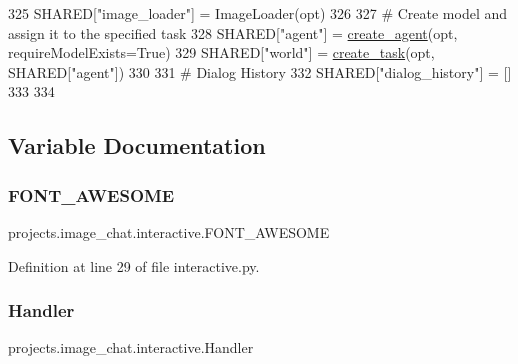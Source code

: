 \begin{DoxyCode}
325     SHARED[\textcolor{stringliteral}{"image\_loader"}] = ImageLoader(opt)
326 
327     \textcolor{comment}{# Create model and assign it to the specified task}
328     SHARED[\textcolor{stringliteral}{"agent"}] = \hyperlink{namespaceparlai_1_1core_1_1agents_ad0d54074d4bcc148bb415ab5515a53b5}{create\_agent}(opt, requireModelExists=\textcolor{keyword}{True})
329     SHARED[\textcolor{stringliteral}{"world"}] = \hyperlink{namespaceparlai_1_1core_1_1worlds_a11923c10b545c7ecc1b08fe2242d9c2c}{create\_task}(opt, SHARED[\textcolor{stringliteral}{"agent"}])
330 
331     \textcolor{comment}{# Dialog History}
332     SHARED[\textcolor{stringliteral}{"dialog\_history"}] = []
333 
334 
\end{DoxyCode}


\subsection{Variable Documentation}
\mbox{\label{namespaceprojects_1_1image__chat_1_1interactive_a180951d02b686de24635f35e1a6dfbc5}} 
\subsubsection{\texorpdfstring{F\+O\+N\+T\+\_\+\+A\+W\+E\+S\+O\+ME}{FONT\_AWESOME}}
{\footnotesize\ttfamily projects.\+image\+\_\+chat.\+interactive.\+F\+O\+N\+T\+\_\+\+A\+W\+E\+S\+O\+ME}



Definition at line 29 of file interactive.\+py.

\mbox{\label{namespaceprojects_1_1image__chat_1_1interactive_ac51164d011818446d45924028cd6183f}} 
\subsubsection{\texorpdfstring{Handler}{Handler}}
{\footnotesize\ttfamily projects.\+image\+\_\+chat.\+interactive.\+Handler}



